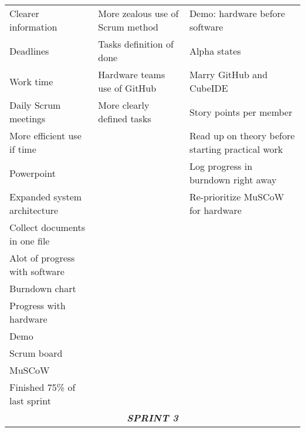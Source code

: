 \begin{table}[htbp]
{\begin{tabular}{lll}
Clearer information                 & More zealous use of Scrum method   & Demo: hardware before software                   \\
Deadlines                           & Tasks definition of done           & Alpha states                                     \\
Work time                           & Hardware teams use of GitHub       & Marry GitHub and CubeIDE                         \\
Daily Scrum meetings                & More clearly defined tasks         & Story points per member                          \\
More efficient use if  time         &                                    & Read up on theory before starting practical work \\
Powerpoint                          &                                    & Log progress in burndown right away              \\
Expanded system architecture        &                                    & Re-prioritize MuSCoW for hardware                \\
Collect documents in one file       &                                    &                                                  \\
Alot of progress with software      &                                    &                                                  \\
Burndown chart                      &                                    &                                                  \\
Progress with hardware              &                                    &                                                  \\
Demo                                &                                    &                                                  \\
Scrum board                         &                                    &                                                  \\
MuSCoW                              &                                    &                                                  \\
Finished 75\% of last sprint        &                                    &                                                  \\ \hline
\multicolumn{3}{c}{\cellcolor{grey}\textit{\textbf{SPRINT 3}}}                                                                              \\ \hline

\end{tabular}}
\end{table}
